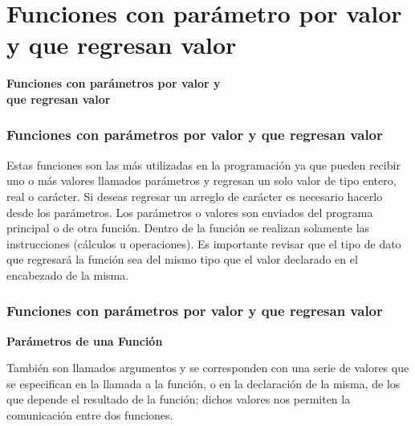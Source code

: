 \section*{Funciones con parámetro por valor y que regresan valor}

\begin{frame}[c] 
\centering
\huge \textbf{Funciones con parámetros por valor y\\que regresan valor}
\end{frame}



\begin{frame}
    \frametitle{Funciones con parámetros por valor y que regresan valor}
    Estas funciones son las más utilizadas en la programación ya que pueden recibir uno o más valores llamados
    parámetros y regresan un solo valor de tipo entero, real o carácter. Si deseas regresar un arreglo de carácter
    es necesario hacerlo desde los parámetros. Los parámetros o valores son enviados del programa principal
    o de otra función. Dentro de la función se realizan solamente las instrucciones (cálculos u operaciones). Es
    importante revisar que el tipo de dato que regresará la función sea del mismo tipo que el valor declarado en
    el encabezado de la misma.
\end{frame}



\begin{frame}
\frametitle{Funciones con parámetros por valor y que regresan valor}
\begin{center}
    \textbf{Parámetros de una Función}
\end{center}
También son llamados argumentos y se corresponden con una serie de valores que se especifican en la
llamada a la función, o en la declaración de la misma, de los que depende el resultado de la función; dichos
valores nos permiten la comunicación entre dos funciones.
\end{frame}




